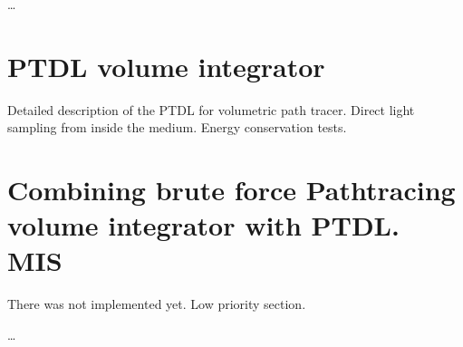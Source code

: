 \ldots

\section{PTDL volume integrator}

Detailed description of the PTDL for volumetric path tracer.
Direct light sampling from inside the medium.
Energy conservation tests.


\section{Combining brute force Pathtracing volume integrator with PTDL. MIS}
There was not implemented yet. Low priority section.

\ldots